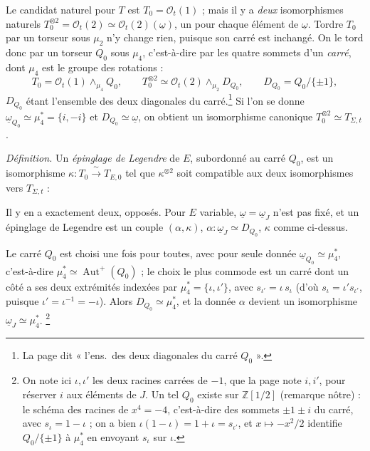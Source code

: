 \documentclass[11pt,a4paper]{article}
\begin{document}
Le candidat naturel pour $T$ est $T_0 = \mathcal{O}_t(1)$ ; mais il y a
\emph{deux} isomorphismes naturels $T_0^{\otimes 2} = \mathcal{O}_t(2) \simeq
\mathcal{O}_t(2)(\underline{\omega})$, un pour chaque élément de
$\underline{\omega}$. Tordre $T_0$ par un torseur sous $\mu_2$ n'y change rien,
puisque son carré est inchangé. On le tord donc par un torseur $Q_0$ sous
$\mu_4$, c'est-à-dire par les quatre sommets d'un \emph{carré}, dont $\mu_4$ est le groupe des
rotations :
\[
T_0 = \mathcal{O}_t(1) \wedge_{\mu_4} Q_0, \qquad T_0^{\otimes 2} \simeq
\mathcal{O}_t(2) \wedge_{\mu_2} D_{Q_0}, \qquad D_{Q_0} = Q_0 / \{\pm 1\},
\]
$D_{Q_0}$ étant l'ensemble des deux diagonales du carré.\footnote{La page dit « l'ens.\ des deux diagonales du carré $Q_0$ ».} Si l'on se
donne $\underline{\omega}_{Q_0} \simeq \mu_4^{*} = \{i, -i\}$ et $D_{Q_0} \simeq
\underline{\omega}$, on obtient un isomorphisme canonique $T_0^{\otimes 2}
\simeq T_{\Sigma,t}$.

\emph{Définition.} Un \emph{épinglage de Legendre} de $E$, subordonné au carré
$Q_0$, est un isomorphisme $\kappa : T_0 \xrightarrow{\;\sim\;} T_{E,0}$ tel que
$\kappa^{\otimes 2}$ soit compatible aux deux isomorphismes vers $T_{\Sigma,t}$
:


Il y en a exactement deux, opposés. Pour $E$ variable, $\underline{\omega} =
\underline{\omega}_J$ n'est pas fixé, et un épinglage de Legendre est un couple
$(\alpha, \kappa)$, $\alpha : \underline{\omega}_J \simeq D_{Q_0}$, $\kappa$ comme
ci-dessus.

Le carré $Q_0$ est choisi une fois pour toutes, avec pour seule donnée
$\underline{\omega}_{Q_0} \simeq \mu_4^{*}$, c'est-à-dire $\mu_4^{*} \simeq
\operatorname{Aut}^{+}(Q_0)$ ; le choix le plus commode est un carré dont un
côté a ses deux extrémités indexées par $\mu_4^{*} = \{\iota, \iota'\}$, avec
$s_{\iota'} = \iota\, s_\iota$ (d'où $s_\iota = \iota' s_{\iota'}$, puisque
$\iota' = \iota^{-1} = -\iota$). Alors $D_{Q_0} \simeq \mu_4^{*}$, et la donnée
$\alpha$ devient un isomorphisme $\underline{\omega}_J \simeq \mu_4^{*}$.%
\footnote{On note ici $\iota, \iota'$ les deux racines carrées de $-1$, que la
page note $i, i'$, pour réserver $i$ aux éléments de $J$. Un tel $Q_0$ existe
sur $\mathbb{Z}[1/2]$ (remarque nôtre) : le schéma des racines de $x^4 = -4$,
c'est-à-dire des sommets $\pm 1 \pm i$ du carré, avec $s_\iota = 1 - \iota$ ;
on a bien $\iota(1 - \iota) = 1 + \iota = s_{\iota'}$, et $x \mapsto -x^2/2$
identifie $Q_0/\{\pm 1\}$ à $\mu_4^{*}$ en envoyant $s_\iota$ sur $\iota$.}
\end{document}

